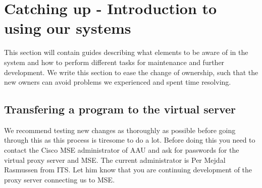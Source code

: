 \section{Catching up - Introduction to using our systems}\label{sec:catchup}
This section will contain guides describing what elements to be aware of in the system and how to perform different tasks for maintenance and further development. We write this section to ease the change of ownership, such that the new owners can avoid problems we experienced and spent time resolving. 

\subsection*{Transfering a program to the virtual server}
We recommend testing new changes as thoroughly as possible before going through this as this process is tiresome to do a lot. Before doing this you need to contact the Cisco MSE administrator of AAU and ask for passwords for the virtual proxy server and MSE. The current administrator is Per Mejdal Rasmussen from ITS. Let him know that you are continuing development of the proxy server connecting us to MSE.

